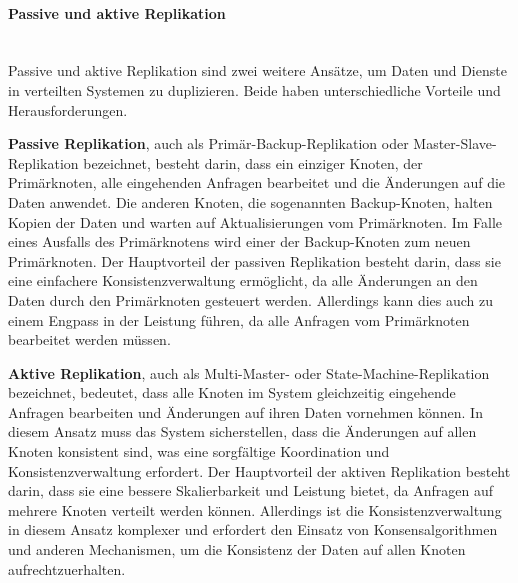 \documentclass[../vs-script-first-v01.tex]{subfiles}
\begin{document}
\paragraph{Passive und aktive Replikation}\mbox{}\\
Passive und aktive Replikation sind zwei weitere Ansätze, um Daten und Dienste in verteilten Systemen zu duplizieren. Beide haben unterschiedliche Vorteile und Herausforderungen.

\textbf{Passive Replikation}, auch als Primär-Backup-Replikation oder Master-Slave-Replikation bezeichnet, besteht darin, dass ein einziger Knoten, der Primärknoten, alle eingehenden Anfragen bearbeitet und die Änderungen auf die Daten anwendet. Die anderen Knoten, die sogenannten Backup-Knoten, halten Kopien der Daten und warten auf Aktualisierungen vom Primärknoten. Im Falle eines Ausfalls des Primärknotens wird einer der Backup-Knoten zum neuen Primärknoten. Der Hauptvorteil der passiven Replikation besteht darin, dass sie eine einfachere Konsistenzverwaltung ermöglicht, da alle Änderungen an den Daten durch den Primärknoten gesteuert werden. Allerdings kann dies auch zu einem Engpass in der Leistung führen, da alle Anfragen vom Primärknoten bearbeitet werden müssen.

\textbf{Aktive Replikation}, auch als Multi-Master- oder State-Machine-Replikation bezeichnet, bedeutet, dass alle Knoten im System gleichzeitig eingehende Anfragen bearbeiten und Änderungen auf ihren Daten vornehmen können. In diesem Ansatz muss das System sicherstellen, dass die Änderungen auf allen Knoten konsistent sind, was eine sorgfältige Koordination und Konsistenzverwaltung erfordert. Der Hauptvorteil der aktiven Replikation besteht darin, dass sie eine bessere Skalierbarkeit und Leistung bietet, da Anfragen auf mehrere Knoten verteilt werden können. Allerdings ist die Konsistenzverwaltung in diesem Ansatz komplexer und erfordert den Einsatz von Konsensalgorithmen und anderen Mechanismen, um die Konsistenz der Daten auf allen Knoten aufrechtzuerhalten.
\end{document}
